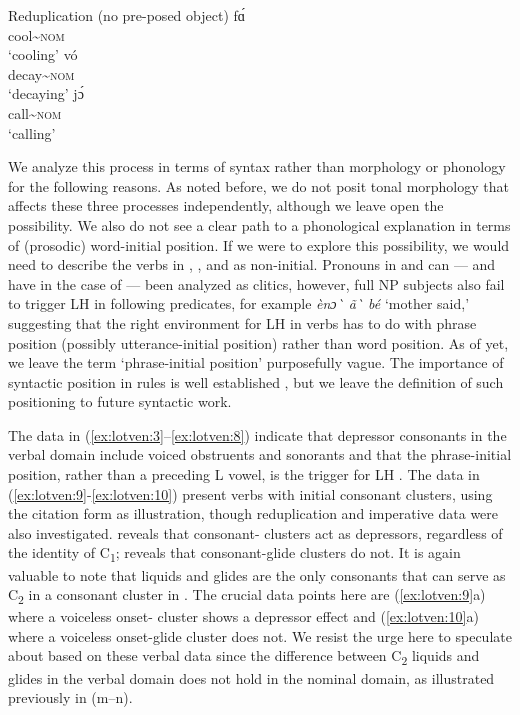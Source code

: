 \documentclass[output=paper,newtxmath,modfonts,nonflat]{langsci/langscibook}
\begin{document}
\ea\label{ex:lotven:8}Reduplication (no pre-posed object)
\ea\label{ex:lotven:8a}    
    fɑ́\\
    cool{\textasciitilde}\textsc{nom}    \\
    \glt ‘cooling’
\ex\label{ex:lotven:8b}
	vó\\
    decay{\textasciitilde}\textsc{nom}\\
    \glt ‘decaying’
\ex\label{ex:lotven:8c}
	jɔ́\\
    call{\textasciitilde}\textsc{nom} \\
    \glt ‘calling’
\z
\z


We analyze this process in terms of syntax rather than morphology or phonology for the following reasons. As noted before, we do not posit tonal morphology that affects these three processes independently, although we leave open the possibility. We also do not see a clear path to a phonological explanation in terms of (prosodic) word-initial position. If we were to explore this possibility, we would need to describe the verbs in , , and  as non-initial. Pronouns in  and  can — and have in the case of  \citep{Duthie1996} — been analyzed as clitics, however, full NP subjects also fail to trigger LH  in following predicates, for example \textit{ènɔ\`{} ã\`{}  bé} ‘mother said,’ suggesting that the right environment for LH  in verbs has to do with phrase position (possibly utterance-initial position) rather than word position. As of yet, we leave the term ‘phrase-initial position’ purposefully vague. The importance of syntactic position in  rules is well established \citep{Snider2014}, but we leave the definition of such positioning to future syntactic work.

The data in (\ref{ex:lotven:3}–\ref{ex:lotven:8}) indicate that depressor consonants in the verbal domain include voiced obstruents and sonorants and that the phrase-initial position, rather than a preceding L  vowel, is the trigger for LH . The data in (\ref{ex:lotven:9}-\ref{ex:lotven:10}) present verbs with initial consonant clusters, using the citation form as illustration, though reduplication and imperative data were also investigated.  reveals that consonant- clusters act as depressors, regardless of the identity of C\textsubscript{1};  reveals that consonant-glide clusters do not. It is again valuable to note that liquids and glides are the only consonants that can serve as C\textsubscript{2} in a consonant cluster in . The crucial data points here are (\ref{ex:lotven:9}a) where a voiceless onset- cluster shows a depressor effect and (\ref{ex:lotven:10}a) where a voiceless onset-glide cluster does not. We resist the urge here to speculate about  based on these verbal data since the difference between C\textsubscript{2} liquids and glides in the verbal domain does not hold in the nominal domain, as illustrated previously in  (m–n).
\end{document}
